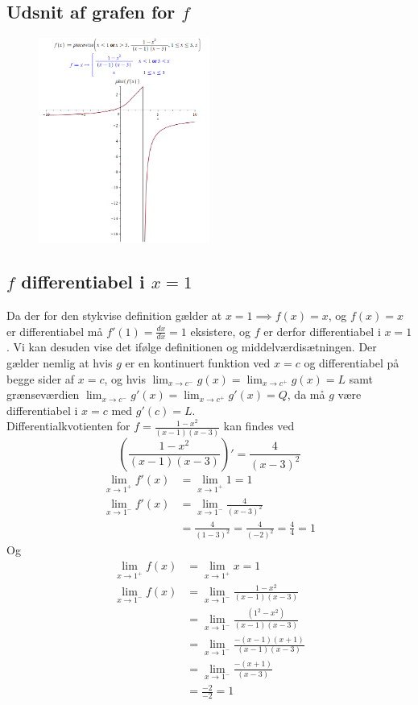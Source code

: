 \documentclass{report}
\begin{document}
\subsection{Udsnit af grafen for $f$}
\begin{figure}[H]
    \centering
    \includegraphics[width=0.5\textwidth]{22a.png}
\end{figure}

\subsection{$f$ differentiabel i $x=1$}
Da der for den stykvise definition gælder at $x=1\implies f(x)=x$, og $f(x)=x$ er differentiabel må $f'(1)=\frac{dx}{dx}
=1$ eksistere, og $f$ er derfor differentiabel i $x=1$. Vi kan desuden vise det ifølge definitionen og middelværdisætningen. Der gælder nemlig at hvis $g$ er en kontinuert funktion ved $x=c$ og differentiabel på begge sider af $x=c$, og hvis $\lim_{x\to c^-}g(x)=\lim_{x\to c^+}g(x)=L$ samt grænseværdien $\lim_{x\to c^-}g'(x)=\lim_{x\to c^+}g'(x)=Q$, da må $g$ være differentiabel i $x=c$ med $g'(c)=L$.\\
Differentialkvotienten for $f=\frac{1-x^2}{(x-1)(x-3)}$ kan findes ved $$\left(\frac{1-x^2}{(x-1)(x-3)}\right)'=\frac{4}{(x-3)^2}$$
\begin{align*}
    \lim_{x\to1^+}f'(x)&=\lim_{x\to1^+}1=1\\
    \lim_{x\to1^-}f'(x)&=\lim_{x\to1^-}\frac{4}{(x-3)^2}\\
    &=\frac{4}{(1-3)^2}=\frac{4}{(-2)^2}=\frac{4}{4}=1
\end{align*}{}
Og
\begin{align*}
    \lim_{x\to1^+}f(x)&=\lim_{x\to1^+}x=1\\
    \lim_{x\to1^-}f(x)&=\lim_{x\to1^-}\frac{1-x^2}{(x-1)(x-3)}\\
    &=\lim_{x\to1^-}\frac{(1^2-x^2)}{(x-1)(x-3)}\\
    &=\lim_{x\to1^-}\frac{-(x-1)(x+1)}{(x-1)(x-3)}\\
    &=\lim_{x\to1^-}\frac{-(x+1)}{(x-3)}\\
    &=\frac{-2}{-2}=1
\end{align*}{}\newpage
\end{document}
